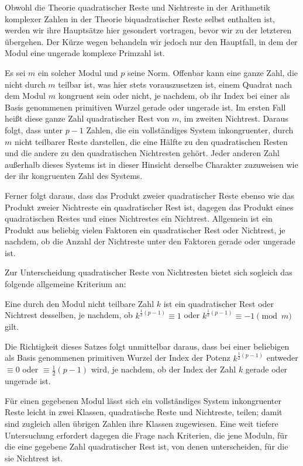 Obwohl die Theorie quadratischer Reste und Nichtreste in der Arithmetik komplexer Zahlen in der Theorie biquadratischer Reste selbst enthalten ist, werden wir ihre Hauptsätze hier gesondert vortragen, bevor wir zu der letzteren übergehen. Der Kürze wegen behandeln wir jedoch nur den Hauptfall, in dem der Modul eine ungerade komplexe Primzahl ist.

Es sei $m$ ein solcher Modul und $p$ seine Norm. Offenbar kann eine ganze Zahl, die nicht durch $m$ teilbar ist, was hier stets vorauszusetzen ist, einem Quadrat nach dem Modul $m$ kongruent sein oder nicht, je nachdem, ob ihr Index bei einer als Basis genommenen primitiven Wurzel gerade oder ungerade ist. Im ersten Fall heißt diese ganze Zahl quadratischer Rest von $m$, im zweiten Nichtrest. Daraus folgt, dass unter $p-1$ Zahlen, die ein vollständiges System inkongruenter, durch $m$ nicht teilbarer Reste darstellen, die eine Hälfte zu den quadratischen Resten und die andere zu den quadratischen Nichtresten gehört. Jeder anderen Zahl außerhalb dieses Systems ist in dieser Hinsicht derselbe
%
Charakter zuzuweisen wie der ihr kongruenten Zahl des Systems.

Ferner folgt daraus, dass das Produkt zweier quadratischer Reste ebenso wie das Produkt zweier Nichtreste ein quadratischer Rest ist, dagegen das Produkt eines quadratischen Restes und eines Nichtrestes ein Nichtrest. Allgemein ist ein Produkt aus beliebig vielen Faktoren ein quadratischer Rest oder Nichtrest, je nachdem, ob die Anzahl der Nichtreste unter den Faktoren gerade oder ungerade ist.

Zur Unterscheidung quadratischer Reste von Nichtresten bietet sich sogleich das folgende allgemeine Kriterium an:

Eine durch den Modul nicht teilbare Zahl $k$ ist ein quadratischer Rest oder Nichtrest desselben, je nachdem, ob $k^{\frac12(p-1)}\equiv1$ oder $k^{\frac12(p-1)}\equiv-1\pmod m$ gilt.

Die Richtigkeit dieses Satzes folgt unmittelbar daraus, dass bei einer beliebigen als Basis genommenen primitiven Wurzel der Index der Potenz $k^{\frac12(p-1)}$ entweder $\equiv0$ oder $\equiv\frac12(p-1)$ wird, je nachdem, ob der Index der Zahl $k$ gerade oder ungerade ist.

Für einen gegebenen Modul lässt sich ein vollständiges System inkongruenter Reste leicht in zwei Klassen, quadratische Reste und Nichtreste, teilen; damit sind zugleich allen übrigen Zahlen ihre Klassen zugewiesen. Eine weit tiefere Untersuchung erfordert dagegen die Frage nach Kriterien, die jene Moduln, für die eine gegebene Zahl quadratischer Rest ist, von denen unterscheiden, für die sie Nichtrest ist.

